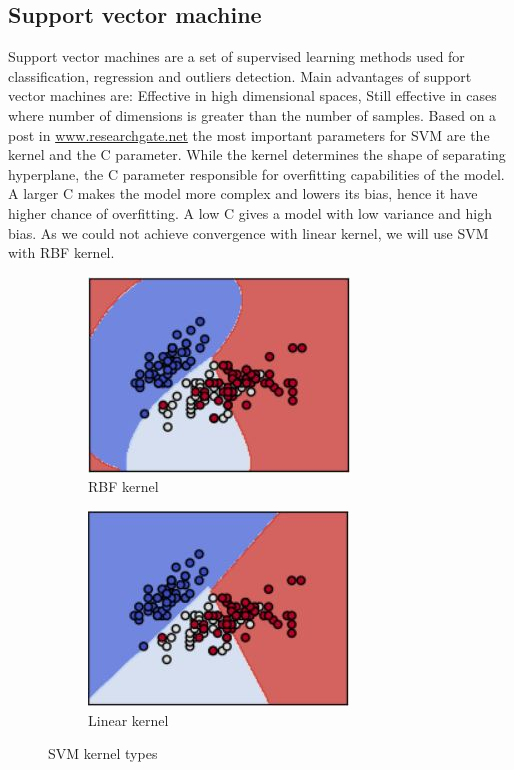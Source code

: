 \documentclass[12pt]{article}
\begin{document}
\newpage
\subsection{Support vector machine}
Support vector machines are a set of supervised learning methods used for classification, regression and outliers detection. Main advantages of support vector machines are: Effective in high dimensional spaces, Still effective in cases where number of dimensions is greater than the number of samples. Based on a post in  \href{https://www.researchgate.net/post/Is_it_necessary_to_choose_kernels_in_SVM_according_to_application}{www.researchgate.net} the most important parameters for SVM are the kernel and the C parameter. While the kernel determines the shape of separating hyperplane, the C parameter responsible for overfitting capabilities of the model. A larger C makes the model more complex and lowers its bias, hence it have higher chance of overfitting. A low C gives a model with low variance and high bias. As we could not achieve convergence with linear kernel, we will use SVM with RBF kernel.

\begin{figure}[h]
\centering
\begin{subfigure}{.4\textwidth}
  \centering
  \includegraphics[width=.7\linewidth]{report_pics/SVM_RBF}
  \caption{RBF kernel}
  \label{fig:sub1}
\end{subfigure}%
\begin{subfigure}{.4\textwidth}
  \centering
  \includegraphics[width=.7\linewidth]{report_pics/SVM_linear}
  \caption{Linear kernel}
  \label{fig:sub2}
\end{subfigure}
\caption{SVM kernel types}
\label{fig:test}
\end{figure}
\end{document}
